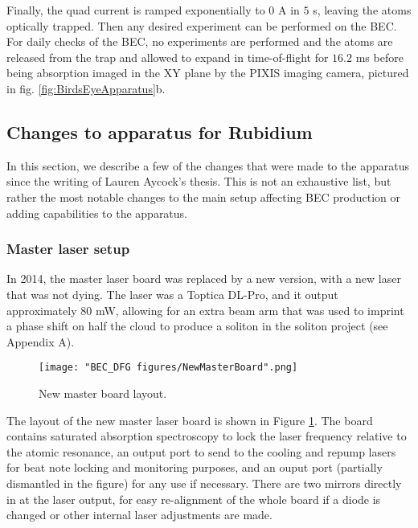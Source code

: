 Finally, the quad current is ramped exponentially to $0$ A in $5$ s, leaving the atoms optically trapped. Then any desired experiment can be performed on the BEC. For daily checks of the BEC, no experiments are performed and the atoms are released from the trap and allowed to expand in time-of-flight for $16.2$ ms before being absorption imaged in the XY plane by the PIXIS imaging camera, pictured in fig. \ref{fig:BirdsEyeApparatus}b.

\subsection{Changes to apparatus for Rubidium}\label{sec:BECchanges}

In this section, we describe a few of the changes that were made to the apparatus since the writing of Lauren Aycock's thesis\cite{AycockThesis}. This is not an exhaustive list, but rather the most notable changes to the main setup affecting BEC production or adding capabilities to the apparatus. 

\subsubsection{Master laser setup}
In 2014, the master laser board was replaced by a new version, with a new laser that was not dying. The laser was a Toptica DL-Pro, and it output approximately $80$ mW, allowing for an extra beam arm that was used to imprint a phase shift on half the cloud to produce a soliton in the soliton project (see Appendix A)\cite{Aycock2017}.
\begin{figure}
	\texttt{[image: "BEC\_DFG figures/NewMasterBoard".png]}
\caption[New master board layout]{New master board layout. }
\label{fig:NewMasterBoard}
\end{figure}

The layout of the new master laser board is shown in Figure \ref{fig:NewMasterBoard}. The board contains saturated absorption spectroscopy to lock the laser frequency relative to the atomic resonance, an output port to send to the cooling and repump lasers for beat note locking and monitoring purposes, and an ouput port (partially dismantled in the figure) for any use if necessary. There are two mirrors directly in at the laser output, for easy re-alignment of the whole board if a diode is changed or other internal laser adjustments are made. 

